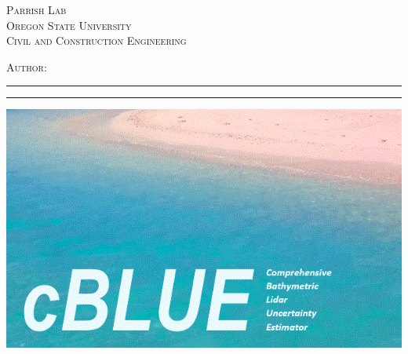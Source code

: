 %
\noindent %
%
\begin{minipage}{.40\textwidth}
    \textsc{Parrish Lab} \\ 
    \small\textsc{Oregon State University}\\%
    \small\textsc{Civil and Construction Engineering}
\end{minipage}%
\hfill	
\begin{minipage}{0.60\textwidth}%
    \raggedleft%
    {\Large \textsc{\coursetitle { } \coursenumber}\par}
    \doublerule %
    \textsc{Author}: \instructor\\
\end{minipage}%
\vspace{1.0cm}
{
    \hrule\vspace{.2cm}
    \centering
    { 
        \huge \color{darkestblue}{\doctitle}{ }\par}
    \vspace{.3cm}    
}
{
    \hrule\vspace{.3cm}

}    

\centering
\includegraphics[width=\linewidth]{figs/cBLUE_splash.png}
\raggedleft
\vspace{0.3cm}
